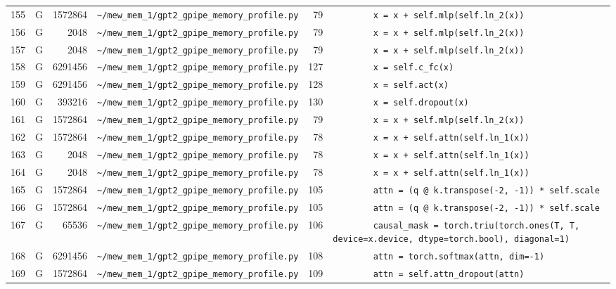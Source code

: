 \documentclass{article}
\begin{document}
\begin{longtable}{r l r p{6.5cm} r p{7.0cm}}
155 & G & 1572864 & \lstinline|~/mew_mem_1/gpt2_gpipe_memory_profile.py| & 79 & \lstinline|        x = x + self.mlp(self.ln_2(x))| \\
156 & G & 2048 & \lstinline|~/mew_mem_1/gpt2_gpipe_memory_profile.py| & 79 & \lstinline|        x = x + self.mlp(self.ln_2(x))| \\
157 & G & 2048 & \lstinline|~/mew_mem_1/gpt2_gpipe_memory_profile.py| & 79 & \lstinline|        x = x + self.mlp(self.ln_2(x))| \\
158 & G & 6291456 & \lstinline|~/mew_mem_1/gpt2_gpipe_memory_profile.py| & 127 & \lstinline|        x = self.c_fc(x)| \\
159 & G & 6291456 & \lstinline|~/mew_mem_1/gpt2_gpipe_memory_profile.py| & 128 & \lstinline|        x = self.act(x)| \\
160 & G & 393216 & \lstinline|~/mew_mem_1/gpt2_gpipe_memory_profile.py| & 130 & \lstinline|        x = self.dropout(x)| \\
161 & G & 1572864 & \lstinline|~/mew_mem_1/gpt2_gpipe_memory_profile.py| & 79 & \lstinline|        x = x + self.mlp(self.ln_2(x))| \\
162 & G & 1572864 & \lstinline|~/mew_mem_1/gpt2_gpipe_memory_profile.py| & 78 & \lstinline|        x = x + self.attn(self.ln_1(x))| \\
163 & G & 2048 & \lstinline|~/mew_mem_1/gpt2_gpipe_memory_profile.py| & 78 & \lstinline|        x = x + self.attn(self.ln_1(x))| \\
164 & G & 2048 & \lstinline|~/mew_mem_1/gpt2_gpipe_memory_profile.py| & 78 & \lstinline|        x = x + self.attn(self.ln_1(x))| \\
165 & G & 1572864 & \lstinline|~/mew_mem_1/gpt2_gpipe_memory_profile.py| & 105 & \lstinline|        attn = (q @ k.transpose(-2, -1)) * self.scale| \\
166 & G & 1572864 & \lstinline|~/mew_mem_1/gpt2_gpipe_memory_profile.py| & 105 & \lstinline|        attn = (q @ k.transpose(-2, -1)) * self.scale| \\
167 & G & 65536 & \lstinline|~/mew_mem_1/gpt2_gpipe_memory_profile.py| & 106 & \lstinline|        causal_mask = torch.triu(torch.ones(T, T, device=x.device, dtype=torch.bool), diagonal=1)| \\
168 & G & 6291456 & \lstinline|~/mew_mem_1/gpt2_gpipe_memory_profile.py| & 108 & \lstinline|        attn = torch.softmax(attn, dim=-1)| \\
169 & G & 1572864 & \lstinline|~/mew_mem_1/gpt2_gpipe_memory_profile.py| & 109 & \lstinline|        attn = self.attn_dropout(attn)| \\

\end{longtable}
\end{document}
